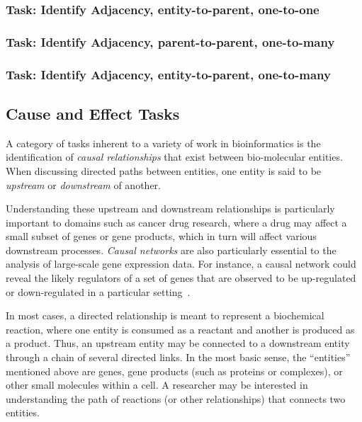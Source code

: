 \documentclass{egpubl}
\begin{document}
\subsubsection{Task: Identify Adjacency, entity-to-parent, one-to-one}
\subsubsection{Task: Identify Adjacency, parent-to-parent, one-to-many}
\subsubsection{Task: Identify Adjacency, entity-to-parent, one-to-many}

\subsection{Cause and Effect Tasks}

A category of tasks inherent to a variety of work in bioinformatics is the identification of \textit{causal relationships} that exist between bio-molecular entities.
When discussing directed paths between entities, one entity is said to be \emph{upstream} or \emph{downstream} of another.

Understanding these upstream and downstream relationships is particularly important to domains such as cancer drug research, where a drug may affect a small subset of genes or gene products, which in turn will affect various downstream processes.
\emph{Causal networks} are also particularly essential to the analysis of large-scale gene expression data.
For instance, a causal network could reveal the likely regulators of a set of genes that are observed to be up-regulated or down-regulated in a particular setting~\cite{felciano2013predictive, Kramer2013ipa-causal}.

In most cases, a directed relationship is meant to represent a biochemical reaction, where one entity is consumed as a reactant and another is produced as a product.
Thus, an upstream entity may be connected to a downstream entity through a chain of several directed links.
In the most basic sense, the ``entities'' mentioned above are genes, gene products (such as proteins or complexes), or other small molecules within a cell.
A researcher may be interested in understanding the path of reactions (or other relationships) that connects two entities.
\end{document}
